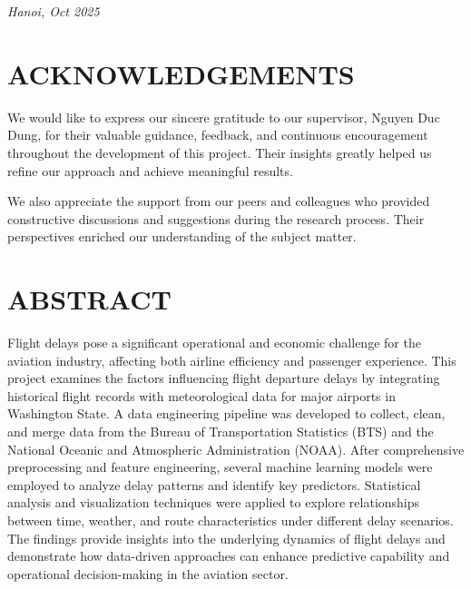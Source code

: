 \documentclass[a4paper,12pt]{report}
\begin{document}
\vfill

\begin{center}
    \textit{Hanoi, Oct 2025}
\end{center}
\newpage
{} 
\setcounter{page}{2}  


\tableofcontents  %
\newpage
\listoffigures        %
\listoftables         %

\newpage

\chapter*{ACKNOWLEDGEMENTS}
We would like to express our sincere gratitude to our supervisor, Nguyen Duc Dung, for their valuable guidance, feedback, and continuous encouragement throughout the development of this project. Their insights greatly helped us refine our approach and achieve meaningful results.

We also appreciate the support from our peers and colleagues who provided constructive discussions and suggestions during the research process. Their perspectives enriched our understanding of the subject matter.

\chapter*{ABSTRACT}
Flight delays pose a significant operational and economic challenge for the aviation industry, affecting both airline efficiency and passenger experience. This project examines the factors influencing flight departure delays by integrating historical flight records with meteorological data for major airports in Washington State. A data engineering pipeline was developed to collect, clean, and merge data from the Bureau of Transportation Statistics (BTS) and the National Oceanic and Atmospheric Administration (NOAA). After comprehensive preprocessing and feature engineering, several machine learning models were employed to analyze delay patterns and identify key predictors. Statistical analysis and visualization techniques were applied to explore relationships between time, weather, and route characteristics under different delay scenarios. The findings provide insights into the underlying dynamics of flight delays and demonstrate how data-driven approaches can enhance predictive capability and operational decision-making in the aviation sector.
\vspace{0.5cm}
\end{document}

